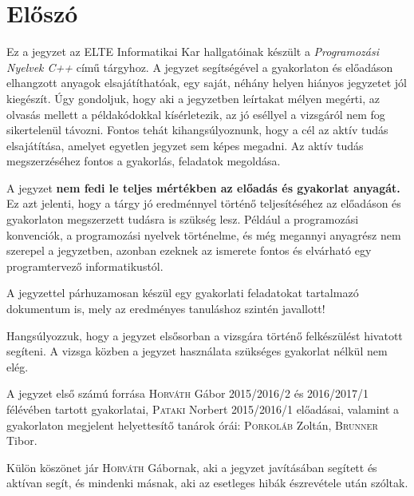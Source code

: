 \documentclass[../cpp_book/cpp_book.tex]{subfiles}
\begin{document}
	\section{Előszó}
	Ez a jegyzet az ELTE Informatikai Kar hallgatóinak készült a \emph{Programozási Nyelvek C++} című tárgyhoz. A jegyzet segítségével a gyakorlaton és előadáson elhangzott anyagok elsajátíthatóak, egy saját, néhány helyen hiányos jegyzetet jól kiegészít. Úgy gondoljuk, hogy aki a jegyzetben leírtakat mélyen megérti, az olvasás mellett a példakódokkal kísérletezik, az jó eséllyel a vizsgáról nem fog sikertelenül távozni. Fontos tehát kihangsúlyoznunk, hogy a cél az aktív tudás elsajátítása, amelyet egyetlen jegyzet sem képes megadni. Az aktív tudás megszerzéséhez fontos a gyakorlás, feladatok megoldása.
	
	A jegyzet \textbf{nem fedi le teljes mértékben az előadás és gyakorlat anyagát.} Ez azt jelenti, hogy a tárgy jó eredménnyel történő teljesítéséhez az előadáson és gyakorlaton megszerzett tudásra is szükség lesz. Például a programozási konvenciók, a programozási nyelvek történelme, és még megannyi anyagrész nem szerepel a jegyzetben, azonban ezeknek az ismerete fontos és elvárható egy programtervező informatikustól.
	
	\smallskip
	A jegyzettel párhuzamosan készül egy gyakorlati feladatokat tartalmazó dokumentum is, mely az eredményes tanuláshoz szintén javallott!
	
	\smallskip
	Hangsúlyozzuk, hogy a jegyzet elsősorban a vizsgára történő felkészülést hivatott segíteni. A vizsga közben a jegyzet használata szükséges gyakorlat nélkül nem elég.
	
	\smallskip
	A jegyzet első számú forrása \textsc{Horváth} Gábor 2015/2016/2 és 2016/2017/1 félévében tartott gyakorlatai, \textsc{Pataki} Norbert 2015/2016/1 előadásai, valamint a gyakorlaton megjelent helyettesítő tanárok órái: \textsc{Porkoláb} Zoltán, \textsc{Brunner} Tibor.
	
	Külön köszönet jár \textsc{Horváth} Gábornak, aki a jegyzet javításában segített és aktívan segít, és mindenki másnak, aki az esetleges hibák észrevétele után szóltak.
	
\end{document}
